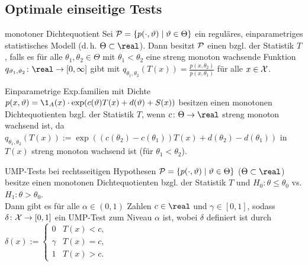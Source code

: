 \subsection{%
    Optimale einseitige Tests%
}

\begin{Def}{monotoner Dichtequotient}
    Sei $\P = \{p(\cdot, \theta) \;|\; \theta \in \Theta\}$ ein reguläres, einparametriges
    statistisches Modell (d.\,h. $\Theta \subset \real$).
    Dann besitzt $\P$ einen  bzgl. der Statistik $T$,
    falls es für alle $\theta_1, \theta_2 \in \Theta$ mit $\theta_1 < \theta_2$
    eine streng monoton wachsende Funktion
    $q_{\theta_1,\theta_2}\colon \real \rightarrow [0, \infty]$ gibt mit
    $q_{\theta_1,\theta_2}(T(x)) = \frac{p(x, \theta_2)}{p(x, \theta_1)}$ für alle $x \in \X$.
\end{Def}

\begin{Bsp}
    Einparametrige Exp.familien mit Dichte
    $p(x, \theta) = \1_A(x) \cdot \exp(c(\theta)T(x) + d(\theta) + S(x))$
    besitzen einen monotonen Dichtequotienten bzgl. der Statistik $T$,
    wenn $c\colon \Theta \rightarrow \real$ streng monoton wachsend ist,
    da $q_{\theta_1,\theta_2}(T(x)) := \exp((c(\theta_2) - c(\theta_1)) T(x) +
    d(\theta_2) - d(\theta_1))$ in $T(x)$ streng monoton wachsend ist
    (für $\theta_1 < \theta_2$).
\end{Bsp}

\begin{Satz}{UMP-Tests bei rechtsseitigen Hypothesen}
    $\P = \{p(\cdot, \theta) \;|\; \theta \in \Theta\}$ ($\Theta \subset \real$) besitze
    einen monotonen Dichtequotienten bzgl. der Statistik $T$ und
    $H_0\colon \theta \le \theta_0$ vs. $H_1\colon \theta > \theta_0$.\\
    Dann gibt es für alle $\alpha \in (0, 1)$ Zahlen $c \in \real$ und $\gamma \in [0, 1]$,
    sodass $\delta\colon \X \rightarrow [0, 1]$ ein UMP-Test zum Niveau $\alpha$ ist, wobei
    $\delta$ definiert ist durch
    $\delta(x) :=  \begin{cases}0 & T(x) < c,\\
    \gamma & T(x) = c,\\1 & T(x) > c.\end{cases}$
\end{Satz}

